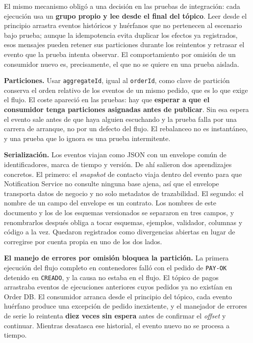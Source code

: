 \documentclass[12pt,a4paper]{article}
\begin{document}
El mismo mecanismo obligó a una decisión en las pruebas de integración: cada ejecución usa un \textbf{grupo propio y lee desde el final del tópico}. Leer desde el principio arrastra eventos históricos y huérfanos que no pertenecen al escenario bajo prueba; aunque la idempotencia evita duplicar los efectos ya registrados, esos mensajes pueden retener sus particiones durante los reintentos y retrasar el evento que la prueba intenta observar. El comportamiento por omisión de un consumidor nuevo es, precisamente, el que no se quiere en una prueba aislada.

\textbf{Particiones.} Usar \texttt{aggregateId}, igual al \texttt{orderId}, como clave de partición conserva el orden relativo de los eventos de un mismo pedido, que es lo que exige el flujo. El coste apareció en las pruebas: hay que \textbf{esperar a que el consumidor tenga particiones asignadas antes de publicar}. Sin esa espera el evento sale antes de que haya alguien escuchando y la prueba falla por una carrera de arranque, no por un defecto del flujo. El rebalanceo no es instantáneo, y una prueba que lo ignora es una prueba intermitente.

\textbf{Serialización.} Los eventos viajan como JSON con un envelope común de identificadores, marca de tiempo y versión. De ahí salieron dos aprendizajes concretos. El primero: el \textit{snapshot} de contacto viaja dentro del evento para que Notification Service no consulte ninguna base ajena, así que el envelope transporta datos de negocio y no solo metadatos de trazabilidad. El segundo: el nombre de un campo del envelope es un contrato. Los nombres de este documento y los de los esquemas versionados se separaron en tres campos, y renombrarlos después obliga a tocar esquemas, ejemplos, validador, columnas y código a la vez. Quedaron registrados como divergencias abiertas en lugar de corregirse por cuenta propia en uno de los dos lados.

\textbf{El manejo de errores por omisión bloquea la partición.} La primera ejecución del flujo completo en contenedores falló con el pedido de \texttt{PAY-OK} detenido en \texttt{CREADO}, y la causa no estaba en el flujo. El tópico de pagos arrastraba eventos de ejecuciones anteriores cuyos pedidos ya no existían en Order DB. El consumidor arranca desde el principio del tópico, cada evento huérfano produce una excepción de pedido inexistente, y el manejador de errores de serie lo reintenta \textbf{diez veces sin espera} antes de confirmar el \textit{offset} y continuar. Mientras desatasca ese historial, el evento nuevo no se procesa a tiempo.
\end{document}
